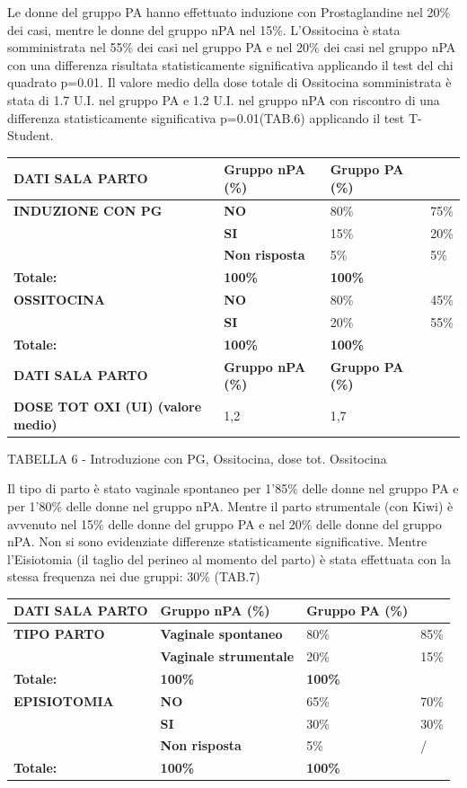 \documentclass[]{article}
\begin{document}
Le donne del gruppo PA hanno effettuato induzione con Prostaglandine nel
20\% dei casi, mentre le donne del gruppo nPA nel 15\%. L'Ossitocina è
stata somministrata nel 55\% dei casi nel gruppo PA e nel 20\% dei casi
nel gruppo nPA con una differenza risultata statisticamente
significativa applicando il test del chi quadrato p=0.01. Il valore
medio della dose totale di Ossitocina somministrata è stata di 1.7 U.I.
nel gruppo PA e 1.2 U.I. nel gruppo nPA con riscontro di una differenza
statisticamente significativa p=0.01(TAB.6) applicando il test
T-Student.

\begin{longtable}[]{@{}llll@{}}
\toprule
\textbf{DATI SALA PARTO} & \textbf{Gruppo nPA (\%)} & \textbf{Gruppo PA
(\%)} &\tabularnewline
\midrule
\endhead
\textbf{INDUZIONE CON PG} & \textbf{NO} & 80\% & 75\%\tabularnewline
& \textbf{SI} & 15\% & 20\%\tabularnewline
& \textbf{Non risposta} & 5\% & 5\%\tabularnewline
\textbf{Totale:} & \textbf{100\%} & \textbf{100\%} &\tabularnewline
\textbf{OSSITOCINA} & \textbf{NO} & 80\% & 45\%\tabularnewline
& \textbf{SI} & 20\% & 55\%\tabularnewline
\textbf{Totale:} & \textbf{100\%} & \textbf{100\%} &\tabularnewline
\textbf{DATI SALA PARTO} & \textbf{Gruppo nPA (\%)} & \textbf{Gruppo PA
(\%)} &\tabularnewline
\textbf{DOSE TOT OXI (UI) (valore medio)} & 1,2 & 1,7 &\tabularnewline
\bottomrule
\end{longtable}

TABELLA 6 - Introduzione con PG, Ossitocina, dose tot. Ossitocina

Il tipo di parto è stato vaginale spontaneo per 1'85\% delle donne nel
gruppo PA e per 1'80\% delle donne nel gruppo nPA. Mentre il parto
strumentale (con Kiwi) è avvenuto nel 15\% delle donne del gruppo PA e
nel 20\% delle donne del gruppo nPA. Non si sono evidenziate differenze
statisticamente significative. Mentre l'Eisiotomia (il taglio del
perineo al momento del parto) è stata effettuata con la stessa frequenza
nei due gruppi: 30\% (TAB.7)

\begin{longtable}[]{@{}llll@{}}
\toprule
\textbf{DATI SALA PARTO} & \textbf{Gruppo nPA (\%)} & \textbf{Gruppo PA
(\%)} &\tabularnewline
\midrule
\endhead
\textbf{TIPO PARTO} & \textbf{Vaginale spontaneo} & 80\% &
85\%\tabularnewline
& \textbf{Vaginale strumentale} & 20\% & 15\%\tabularnewline
\textbf{Totale:} & \textbf{100\%} & \textbf{100\%} &\tabularnewline
\textbf{EPISIOTOMIA} & \textbf{NO} & 65\% & 70\%\tabularnewline
& \textbf{SI} & 30\% & 30\%\tabularnewline
& \textbf{Non risposta} & 5\% & /\tabularnewline
\textbf{Totale:} & \textbf{100\%} & \textbf{100\%} &\tabularnewline
\bottomrule
\end{longtable}
\end{document}
